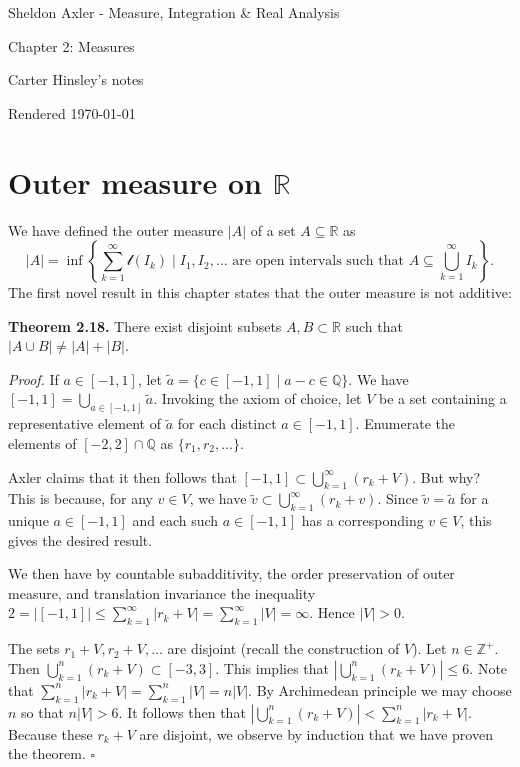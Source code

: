 \documentclass[a4paper]{article}
\newcommand{\R}{\mathbb{R}}
\newcommand{\Q}{\mathbb{Q}}
\newcommand{\Z}{\mathbb{Z}}
\begin{document}
\begin{center}
\LARGE{Sheldon Axler - Measure, Integration \& Real Analysis}

\Large{Chapter 2: Measures}

\large{Carter Hinsley's notes}

Rendered \today
\end{center}

\section{Outer measure on $\R$}

We have defined the outer measure $|A|$ of a set $A \subseteq \R$ as
\[|A| = \inf\left\{\sum_{k=1}^\infty \mathscr{l}(I_k) \mid I_1, I_2, \ldots \text{ are open intervals such that } A \subseteq \bigcup_{k=1}^\infty I_k\right\}.\]
The first novel result in this chapter states that the outer measure is not additive:

\textbf{Theorem 2.18.} There exist disjoint subsets $A, B \subset \R$ such that $|A \cup B| \neq |A| + |B|$.

\emph{Proof.} If $a \in [-1, 1]$, let $\tilde{a} = \{c \in [-1, 1] \mid a - c \in \Q\}$. We have $[-1, 1] = \bigcup_{a \in [-1, 1]} \tilde{a}$. Invoking the axiom of choice, let $V$ be a set containing a representative element of $\tilde{a}$ for each distinct $a \in [-1, 1]$. Enumerate the elements of $[-2, 2] \cap \Q$ as $\{r_1, r_2, \ldots\}$.

Axler claims that it then follows that $[-1, 1] \subset \bigcup_{k=1}^\infty (r_k + V)$. But why? This is because, for any $v \in V$, we have $\tilde{v} \subset \bigcup_{k=1}^\infty (r_k + v)$. Since $\tilde{v} = \tilde{a}$ for a unique $a \in [-1, 1]$ and each such $a \in [-1, 1]$ has a corresponding $v \in V$, this gives the desired result.

We then have by countable subadditivity, the order preservation of outer measure, and translation invariance the inequality $2 = |[-1, 1]| \leq \sum_{k=1}^\infty |r_k + V| = \sum_{k=1}^\infty |V| = \infty$. Hence $|V| > 0$.

The sets $r_1 + V, r_2 + V, \ldots$ are disjoint (recall the construction of $V$). Let $n \in \Z^+$. Then $\bigcup_{k=1}^n (r_k + V) \subset [-3, 3]$. This implies that $\left|\bigcup_{k=1}^n (r_k + V)\right| \leq 6$. Note that $\sum_{k=1}^n |r_k + V| = \sum_{k=1}^n |V| = n|V|$. By Archimedean principle we may choose $n$ so that $n|V| > 6$. It follows then that $\left|\bigcup_{k=1}^n (r_k + V)\right| < \sum_{k=1}^n |r_k + V|$. Because these $r_k + V$ are disjoint, we observe by induction that we have proven the theorem. $\square$
\end{document}
